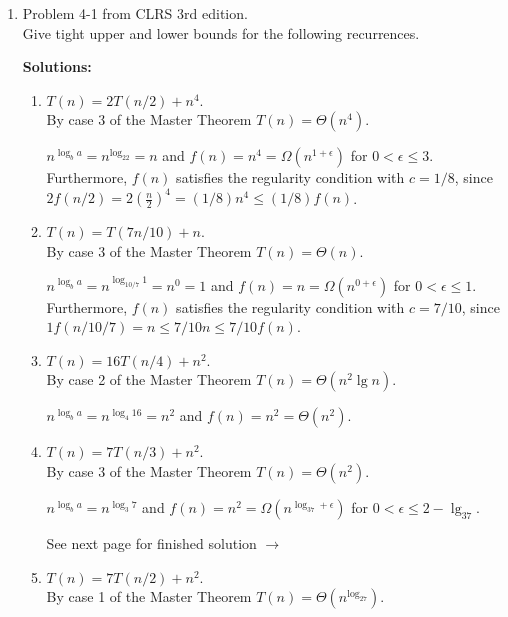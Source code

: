\documentclass[letterpaper,11pt]{article}
\begin{document}
\begin{enumerate}
\item Problem 4-1 from CLRS 3rd edition.\\

Give tight upper and lower bounds for the following recurrences.

\textbf{Solutions:}
\begin{enumerate}
\item $T(n) = 2T(n/2) + n^4$.\\

By case 3 of the Master Theorem $T(n) = \Theta(n^4)$.

$n^{\log_ba} = n^{\log_22} = n$ and $f(n) = n^4 = \Omega(n^{1 + \epsilon})$ for $0 < \epsilon \leq 3$. Furthermore, $f(n)$ satisfies the regularity condition with $c=1/8$, since $2f(n/2) =  2\left(\frac{n}{2}\right)^4 = (1/8)n^4 \leq (1/8)f(n)$.


\item $T(n) = T(7n/10) + n$.\\

By case 3 of the Master Theorem $T(n) = \Theta(n)$. 

$n^{\log_ba} = n^{\log_{10/7}1} = n^0 = 1$ and $f(n) = n = \Omega(n^{0 + \epsilon})$ for $0 < \epsilon \leq 1$. Furthermore, $f(n)$ satisfies the regularity condition with $c=7/10$, since $1f(n/{10/7}) = n \leq 7/10n\leq 7/10f(n)$.


\item $T(n) = 16T(n/4) + n^2$.\\

By case 2 of the Master Theorem $T(n) = \Theta(n^2\lg n)$.

$n^{\log_ba} = n^{\log_{4}16} = n^2$ and $f(n) = n^2 = \Theta(n^2)$.

\item $T(n) = 7T(n/3) + n^2$.\\

By case 3 of the Master Theorem $T(n) = \Theta(n^2)$.

$n^{\log_ba} = n^{\log_{3}7}$ and $f(n) = n^2 = \Omega(n^{\log_37+\epsilon})$ for $0 < \epsilon \leq 2 - \lg_37$.

\vfill{}
\hfill{}See next page for finished solution $\rightarrow$
\newpage

\item $T(n) = 7T(n/2) + n^2$.\\

By case 1 of the Master Theorem $T(n) = \Theta(n^{\log_27})$.


\end{enumerate}
\end{enumerate}
\end{document}
